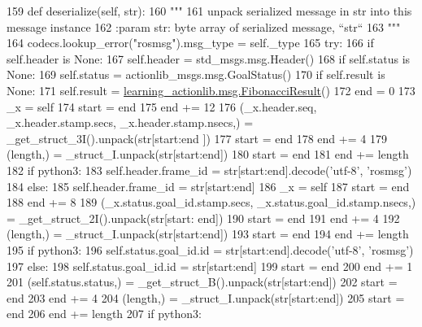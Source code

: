 \begin{DoxyCode}
159   \textcolor{keyword}{def }deserialize(self, str):
160     \textcolor{stringliteral}{"""}
161 \textcolor{stringliteral}{    unpack serialized message in str into this message instance}
162 \textcolor{stringliteral}{    :param str: byte array of serialized message, ``str``}
163 \textcolor{stringliteral}{    """}
164     codecs.lookup\_error(\textcolor{stringliteral}{"rosmsg"}).msg\_type = self.\_type
165     \textcolor{keywordflow}{try}:
166       \textcolor{keywordflow}{if} self.header \textcolor{keywordflow}{is} \textcolor{keywordtype}{None}:
167         self.header = std\_msgs.msg.Header()
168       \textcolor{keywordflow}{if} self.status \textcolor{keywordflow}{is} \textcolor{keywordtype}{None}:
169         self.status = actionlib\_msgs.msg.GoalStatus()
170       \textcolor{keywordflow}{if} self.result \textcolor{keywordflow}{is} \textcolor{keywordtype}{None}:
171         self.result = \hyperlink{classlearning__actionlib_1_1msg_1_1__FibonacciResult_1_1FibonacciResult}{learning\_actionlib.msg.FibonacciResult}()
172       end = 0
173       \_x = self
174       start = end
175       end += 12
176       (\_x.header.seq, \_x.header.stamp.secs, \_x.header.stamp.nsecs,) = \_get\_struct\_3I().unpack(str[start:end
      ])
177       start = end
178       end += 4
179       (length,) = \_struct\_I.unpack(str[start:end])
180       start = end
181       end += length
182       \textcolor{keywordflow}{if} python3:
183         self.header.frame\_id = str[start:end].decode(\textcolor{stringliteral}{'utf-8'}, \textcolor{stringliteral}{'rosmsg'})
184       \textcolor{keywordflow}{else}:
185         self.header.frame\_id = str[start:end]
186       \_x = self
187       start = end
188       end += 8
189       (\_x.status.goal\_id.stamp.secs, \_x.status.goal\_id.stamp.nsecs,) = \_get\_struct\_2I().unpack(str[start:
      end])
190       start = end
191       end += 4
192       (length,) = \_struct\_I.unpack(str[start:end])
193       start = end
194       end += length
195       \textcolor{keywordflow}{if} python3:
196         self.status.goal\_id.id = str[start:end].decode(\textcolor{stringliteral}{'utf-8'}, \textcolor{stringliteral}{'rosmsg'})
197       \textcolor{keywordflow}{else}:
198         self.status.goal\_id.id = str[start:end]
199       start = end
200       end += 1
201       (self.status.status,) = \_get\_struct\_B().unpack(str[start:end])
202       start = end
203       end += 4
204       (length,) = \_struct\_I.unpack(str[start:end])
205       start = end
206       end += length
207       \textcolor{keywordflow}{if} python3:

\end{DoxyCode}
